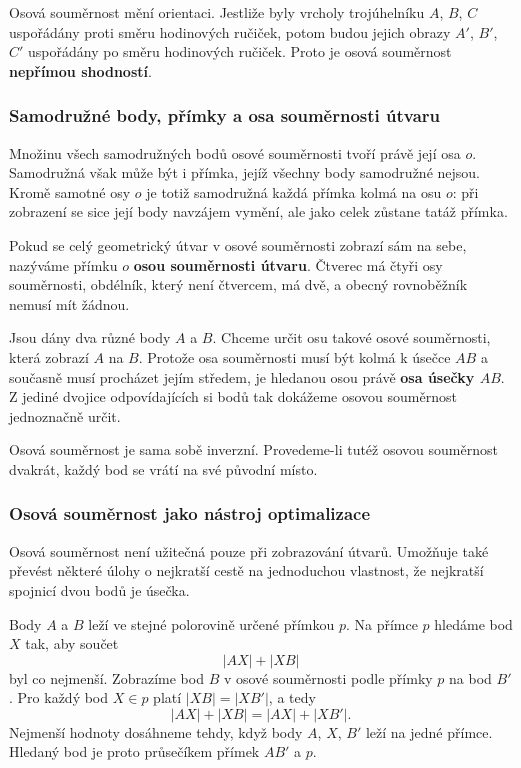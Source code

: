 \documentclass[12pt,a4paper]{article}
\begin{document}
Osová souměrnost mění orientaci. Jestliže byly vrcholy trojúhelníku $A$, $B$, $C$ uspořádány proti směru hodinových ručiček, potom budou jejich obrazy $A'$, $B'$, $C'$ uspořádány po směru hodinových ručiček. Proto je osová souměrnost \textbf{nepřímou shodností}.




\subsubsection*{Samodružné body, přímky a osa souměrnosti útvaru}

Množinu všech samodružných bodů osové souměrnosti tvoří právě její osa $o$. Samodružná však může být i přímka, jejíž všechny body samodružné nejsou. Kromě samotné osy $o$ je totiž samodružná každá přímka kolmá na osu $o$: při zobrazení se sice její body navzájem vymění, ale jako celek zůstane tatáž přímka.

Pokud se celý geometrický útvar v osové souměrnosti zobrazí sám na sebe, nazýváme přímku $o$ \textbf{osou souměrnosti útvaru}. Čtverec má čtyři osy souměrnosti, obdélník, který není čtvercem, má dvě, a obecný rovnoběžník nemusí mít žádnou.

\begin{examplebox}
    Jsou dány dva různé body $A$ a $B$. Chceme určit osu takové osové souměrnosti, která zobrazí $A$ na $B$. Protože osa souměrnosti musí být kolmá k úsečce $AB$ a současně musí procházet jejím středem, je hledanou osou právě \textbf{osa úsečky $AB$}. Z jediné dvojice odpovídajících si bodů tak dokážeme osovou souměrnost jednoznačně určit.
\end{examplebox}

Osová souměrnost je sama sobě inverzní. Provedeme-li tutéž osovou souměrnost dvakrát, každý bod se vrátí na své původní místo.

\subsubsection*{Osová souměrnost jako nástroj optimalizace}

Osová souměrnost není užitečná pouze při zobrazování útvarů. Umožňuje také převést některé úlohy o nejkratší cestě na jednoduchou vlastnost, že nejkratší spojnicí dvou bodů je úsečka.

\begin{examplebox}
    Body $A$ a $B$ leží ve stejné polorovině určené přímkou $p$. Na přímce $p$ hledáme bod $X$ tak, aby součet
    \[
        |AX|+|XB|
    \]
    byl co nejmenší. Zobrazíme bod $B$ v osové souměrnosti podle přímky $p$ na bod $B'$. Pro každý bod $X\in p$ platí $|XB|=|XB'|$, a tedy
    \[
        |AX|+|XB|=|AX|+|XB'|.
    \]
    Nejmenší hodnoty dosáhneme tehdy, když body $A$, $X$, $B'$ leží na jedné přímce. Hledaný bod je proto průsečíkem přímek $AB'$ a $p$.
\end{examplebox}
\end{document}
